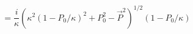 \begin{equation}
 [x_{0},P_{0}]=\frac{i}{\kappa}(\kappa^{2}(1-P_{0}/\kappa)^{2}+P_{0}^{2}-\vec{P}^{2})^{1/2}(1-P_{0}/\kappa)
\end{equation}

